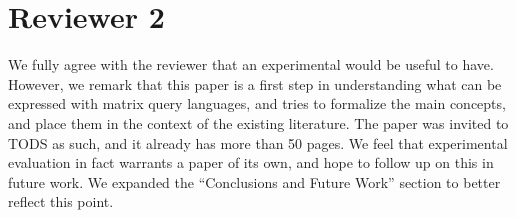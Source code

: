 \section*{Reviewer 2}
\label{sec:reviewer-2}

\bigskip

\begin{comment}
(\ldots) However, being TODS about Database \emph{systems} and thus usually more oriented towards applied results, I wonder whether an additional (even preliminary) experimental evaluation/implementation of the language would have been needed (I will not fight to have that, though).
\end{comment}
\answer We fully agree with the reviewer that an experimental would be useful to have. However, we remark that this paper is a first step in understanding what can be expressed with matrix query languages, and tries to formalize the main concepts, and place them in the context of the existing literature. The paper was invited to TODS as such, and it already has more than 50 pages.  We feel that experimental evaluation in fact warrants a paper of its own, and hope to follow up on this in future work. We expanded the ``Conclusions and Future Work'' section to better reflect this point.

\bigskip


\begin{comment}
	On the negative side, I believe that the paper is trying, in different places to oversell a bit its results. In particular, the paper makes a big deal in explaining that families of circuits are the de-facto representative logic of linear algebra, but you do not clarify if this is the case under the assumption that, e.g., the depth is bounded. Since your equivalence results are about families of bounded depth/degree, you should properly discuss to what extent, families of circuits of this kind are able to express linear algebra constructs.
\end{comment}
\answer \TODO
{}

\bigskip

